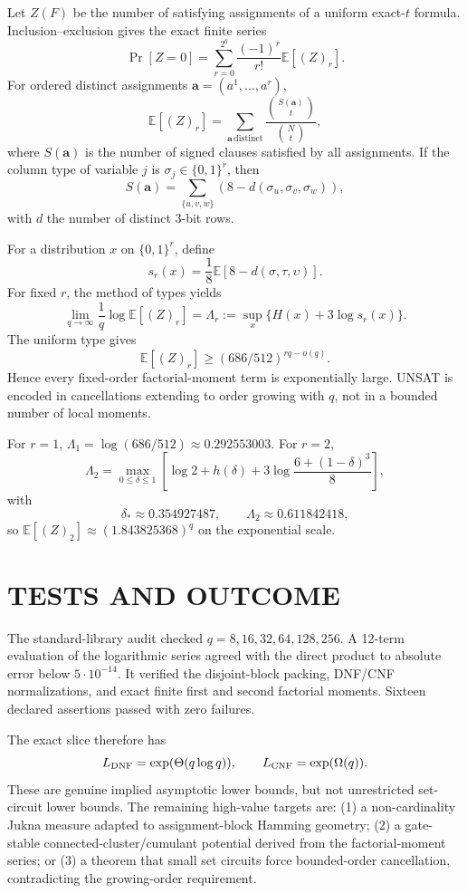 \documentclass[11pt]{article}
\begin{document}
Let $Z(F)$ be the number of satisfying assignments of a uniform exact-$t$ formula. Inclusion--exclusion gives the exact finite series
\[
\Pr[Z=0]=\sum_{r=0}^{2^q}\frac{(-1)^r}{r!}\mathbb E[(Z)_r].
\]
For ordered distinct assignments $\mathbf a=(a^1,\ldots,a^r)$,
\[
\mathbb E[(Z)_r]=\sum_{\mathbf a\,\mathrm{distinct}}\frac{\binom{S(\mathbf a)}t}{\binom Nt},
\]
where $S(\mathbf a)$ is the number of signed clauses satisfied by all assignments. If the column type of variable $j$ is $\sigma_j\in\{0,1\}^r$, then
\[
S(\mathbf a)=\sum_{\{u,v,w\}}(8-d(\sigma_u,\sigma_v,\sigma_w)),
\]
with $d$ the number of distinct 3-bit rows.

For a distribution $x$ on $\{0,1\}^r$, define
\[
s_r(x)=\frac18\mathbb E[8-d(\sigma,\tau,\upsilon)].
\]
For fixed $r$, the method of types yields
\[
\lim_{q\to\infty}\frac1q\log\mathbb E[(Z)_r]
=\Lambda_r:=\sup_x\{H(x)+3\log s_r(x)\}.
\]
The uniform type gives
\[
\mathbb E[(Z)_r]\ge(686/512)^{rq-o(q)}.
\]
Hence every fixed-order factorial-moment term is exponentially large. UNSAT is encoded in cancellations extending to order growing with $q$, not in a bounded number of local moments.

For $r=1$, $\Lambda_1=\log(686/512)\approx0.292553003$. For $r=2$,
\[
\Lambda_2=\max_{0\le\delta\le1}\left[\log2+h(\delta)+3\log\frac{6+(1-\delta)^3}{8}\right],
\]
with
\[
\delta_*\approx0.354927487,\qquad \Lambda_2\approx0.611842418,
\]
so $\mathbb E[(Z)_2]\approx(1.843825368)^q$ on the exponential scale.

\section{TESTS AND OUTCOME}
The standard-library audit checked $q=8,16,32,64,128,256$. A 12-term evaluation of the logarithmic series agreed with the direct product to absolute error below $5\cdot10^{-14}$. It verified the disjoint-block packing, DNF/CNF normalizations, and exact finite first and second factorial moments. Sixteen declared assertions passed with zero failures.

The exact slice therefore has
\[
L_{\rm DNF}=\exp(\Theta(q\log q)),\qquad L_{\rm CNF}=\exp(\Omega(q)).
\]
These are genuine implied asymptotic lower bounds, but not unrestricted set-circuit lower bounds. The remaining high-value targets are: (1) a non-cardinality Jukna measure adapted to assignment-block Hamming geometry; (2) a gate-stable connected-cluster/cumulant potential derived from the factorial-moment series; or (3) a theorem that small set circuits force bounded-order cancellation, contradicting the growing-order requirement.
\end{document}
